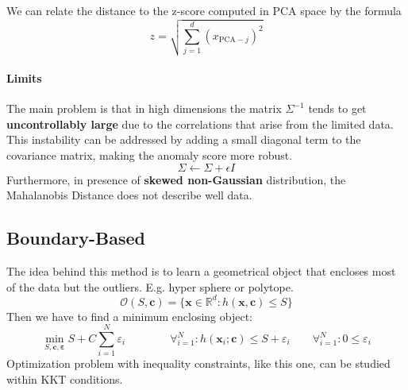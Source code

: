 We can relate the distance to the z-score computed in PCA space by the formula
\begin{equation}
	z = \sqrt{\sum_{j=1}^{d}(x_{\text{PCA}-j})^2}
\end{equation}

\paragraph{Limits} The main problem is that in high dimensions the matrix $\Sigma^{-1}$ tends to get \textbf{uncontrollably large} due to the correlations that arise from the limited data. This instability can be addressed by adding a small diagonal term to the covariance matrix, making the anomaly score more robust.
\begin{equation}
	\Sigma \leftarrow \Sigma+\epsilon I
\end{equation}
Furthermore, in presence of \textbf{skewed non-Gaussian} distribution, the Mahalanobis Distance does not describe well data.

\subsection{Boundary-Based}
The idea behind this method is to learn a geometrical object that encloses most of the data but the outliers. E.g. hyper sphere or polytope.
\begin{equation}
	\mathcal{O}(S,\mathbf{c}) = \{\mathbf{x} \in \mathbb{R}^d : h(\mathbf{x}, \mathbf{c}) \leq S\}
\end{equation}
Then we have to find a minimum enclosing object:
\begin{equation}
	\min_{S, \mathbf{c}, \mathbf{\varepsilon}} S+C\sum_{i=1}^{N}\varepsilon_i \qquad\qquad \forall_{i=1}^N : h(\mathbf{x}_i; \mathbf{c}) \leq S + \varepsilon_i \qquad\forall_{i=1}^N : 0 \leq \varepsilon_i
\end{equation}
Optimization problem with inequality constraints, like this one, can be studied within KKT conditions.

